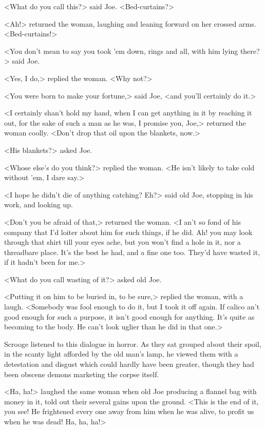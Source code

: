 <What do you call this?> said Joe. <Bed-curtains?>

<Ah!> returned the woman, laughing and leaning forward on her crossed arms.
<Bed-curtains!>

<You don't mean to say you took 'em down, rings and all, with him lying there?>
said Joe.

<Yes, I do,> replied the woman. <Why not?>

<You were born to make your fortune,> said Joe, <and you'll certainly do it.>

<I certainly shan't hold my hand, when I can get anything in it by reaching it
out, for the sake of such a man as he was, I promise you, Joe,> returned the
woman coolly. <Don't drop that oil upon the blankets, now.>

<His blankets?> asked Joe.

<Whose else's do you think?> replied the woman. <He isn't likely to take cold
without 'em, I dare say.>

<I hope he didn't die of anything catching? Eh?> said old Joe, stopping in his
work, and looking up.

<Don't you be afraid of that,> returned the woman. <I an't so fond of his
company that I'd loiter about him for such things, if he did. Ah! you may look
through that shirt till your eyes ache, but you won't find a hole in it, nor a
threadbare place. It's the best he had, and a fine one too. They'd have wasted
it, if it hadn't been for me.>

<What do you call wasting of it?> asked old Joe.

<Putting it on him to be buried in, to be sure,> replied the woman, with a
laugh. <Somebody was fool enough to do it, but I took it off again. If calico
an't good enough for such a purpose, it isn't good enough for anything. It's
quite as becoming to the body. He can't look uglier than he did in that one.>

Scrooge listened to this dialogue in horror. As they sat grouped about their
spoil, in the scanty light afforded by the old man's lamp, he viewed them with a
detestation and disgust which could hardly have been greater, though they had
been obscene demons marketing the corpse itself.

<Ha, ha!> laughed the same woman when old Joe producing a flannel bag with money
in it, told out their several gains upon the ground. <This is the end of it, you
see! He frightened every one away from him when he was alive, to profit us when
he was dead! Ha, ha, ha!>

